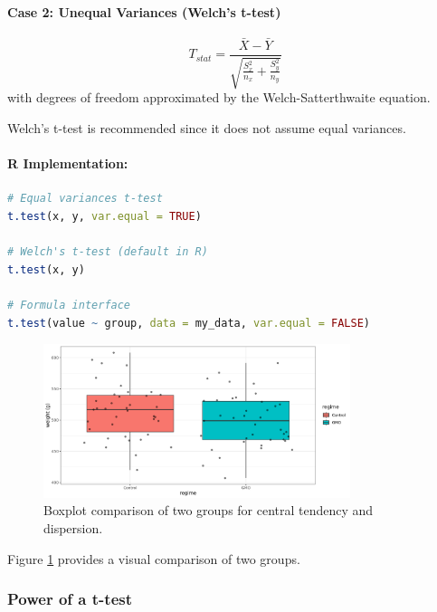 \documentclass[11pt,a4paper]{article}
\begin{document}
\paragraph{Case 2: Unequal Variances (Welch's t-test)}
\begin{equation}
T_{stat} = \frac{\bar{X} - \bar{Y}}{\sqrt{\frac{S_x^2}{n_x} + \frac{S_y^2}{n_y}}}
\end{equation}
with degrees of freedom approximated by the Welch-Satterthwaite equation.

\begin{tipbox}
Welch's t-test is recommended since it does not assume equal variances.
\end{tipbox}

\paragraph{R Implementation:}
\begin{lstlisting}[language=R]
# Equal variances t-test
t.test(x, y, var.equal = TRUE)

# Welch's t-test (default in R)
t.test(x, y)

# Formula interface
t.test(value ~ group, data = my_data, var.equal = FALSE)
\end{lstlisting}

\begin{figure}[htb]
    \centering
    \includegraphics[width=0.8\textwidth]{group-comparison-boxplot.png}
    \caption{Boxplot comparison of two groups for central tendency and dispersion.}
    \label{fig:group-comparison}
\end{figure}

Figure \ref{fig:group-comparison} provides a visual comparison of two groups.

\subsubsection{Power of a t-test}
\end{document}
